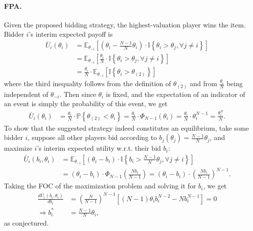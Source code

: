 \documentclass[a4paper]{article}
\begin{document}
\paragraph{FPA.} 
Given the proposed bidding strategy, the highest-valuation player wins the item. Bidder $i$'s interim expected payoff is
\begin{align*}
	\bar{U}_i(\theta_i) &= \mathbb{E}_{\theta_{-i}} \left[ \left( \theta_i - \frac{N-1}{N} \theta_i \right) \cdot \mathbb{I} \left\{ \theta_i > \theta_j, \forall j \neq i \right\} \right]
	\\
	&= \mathbb{E}_{\theta_{-i}} \left[ \frac{\theta_i}{N} \cdot \mathbb{I} \left\{ \theta_i > \theta_j, \forall j \neq i \right\} \right]
	\\
	&= \frac{\theta_i}{N} \cdot \mathbb{E}_{\theta_{-i}} \left[ \mathbb{I} \left\{ \theta_i > \theta_{(2)} \right\} \right]
\end{align*}
where the third inequality follows from the definition of $\theta_{(2)}$ and from $\frac{\theta_i}{N}$ being independent of $\theta_{-i}$. Then since $\theta_i$ is fixed, and the expectation of an indicator of an event is simply the probability of this event, we get
\begin{align*}
	\bar{U}_i(\theta_i) 
	&= \frac{\theta_i}{N} \cdot \mathbb{P} \left\{ \theta_{(2)} < \theta_i \right\}
	= \frac{\theta_i}{N} \cdot \Phi_{N-1} (\theta_i)
	= \frac{\theta_i}{N} \cdot \theta_i^{N-1}
	= \frac{\theta_i^N}{N}.
\end{align*}
To show that the suggested strategy indeed constitutes an equilibrium, take some bidder $i$, suppose all other players bid according to $b_j(\theta_j) = \frac{N-1}{N} \theta_j$, and maximize $i$'s interim expected utility w.r.t. their bid $b_i$:
\begin{align*}
	\bar{U}_i(b_i,\theta_i) &= \mathbb{E}_{\theta_{-i}} \left[ \left( \theta_i - b_i \right) \cdot \mathbb{I} \left\{ b_i > \frac{N-1}{N} \theta_j, \forall j \neq i \right\} \right]
	\\
	&= (\theta_i - b_i) \cdot \Phi_{N-1} \left(\frac{N b_i}{N-1} \right) = (\theta_i - b_i) \cdot \left(\frac{N b_i}{N-1} \right)^{N-1}.
\end{align*}
Taking the FOC of the maximization problem and solving it for $b_i$, we get
\begin{align*}
	\frac{d \bar{U}_i(b_i,\theta_i)}{db_i} 
	&= \left(\frac{N}{N-1} \right)^{N-1} \left[(N-1) \theta_i b_i^{N-2} - N b_i^{N-1} \right] = 0
	\\ \Rightarrow
	b_i^* &= \frac{N-1}{N} \theta_i,
\end{align*}
as conjectured.
\end{document}

